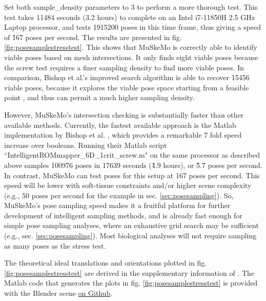 \documentclass{article}
\begin{document}
Set both sample\_density parameters to 3 to perform a more thorough test. This test takes 11484 seconds (3.2 hours) to complete on an Intel i7-11850H 2.5 GHz Laptop processor, and tests 1915200 poses in this time frame, thus giving a speed of \~167 poses per second. The results are presented in fig. \ref{fig:posesamplestresstest}. This shows that MuSkeMo is correctly able to identify viable poses based on mesh intersections. It only finds eight viable poses because the screw test requires a finer sampling density to find more viable poses. In comparison, Bishop et al.'s improved search algorithm is able to recover 15456 viable poses, because it explores the viable pose space starting from a feasible point \cite{bishopIntelligentSamplingHighdimensional2023}, and thus can permit a much higher sampling density.

However, MuSkeMo's intersection checking is substantially faster than other available methods. Currently, the fastest available approach is the Matlab implementation by Bishop et al. \cite{bishopIntelligentSamplingHighdimensional2023}, which provides a remarkable 7 fold speed increase over booleans. Running their Matlab script ``IntelligentROMmapper\_6D\_1crit\_screw.m" on the same processor as described above samples 100976 poses in 17639 seconds (\~4.9 hours), or \~5.7 poses per second. In contrast, MuSkeMo can test poses for this setup at 167 poses per second. This speed will be lower with soft-tissue constraints and/or higher scene complexity (e.g., 50 poses per second for the example in sec. \ref{sec:posesampling}). So, MuSkeMo's pose sampling speed makes it a fruitful platform for further development of intelligent sampling methods, and is already fast enough for simple pose sampling analyses, where an exhaustive grid search may be sufficient (e.g., sec. \ref{sec:posesampling}). Most biological analyses will not require sampling as many poses as the stress test.

The theoretical ideal translations and orientations plotted in fig. \ref{fig:posesamplestresstest} are derived in the supplementary information of \cite{bishopIntelligentSamplingHighdimensional2023}. The Matlab code that generates the plots in fig. \ref{fig:posesamplestresstest} is provided with the Blender scene \href{https://github.com/PashavanBijlert/MuSkeMo/releases/tag/v0.x-posesamplestresstest}{on Github}.
\end{document}

